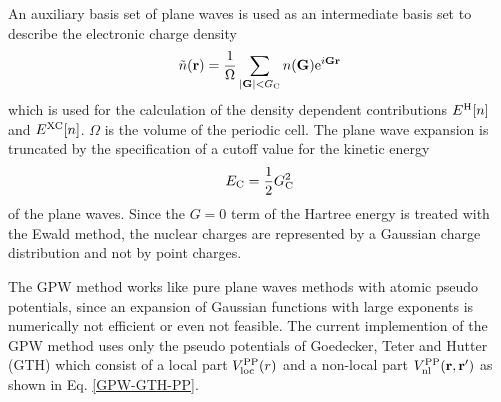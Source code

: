 \documentclass[12pt,twoside]{article}
\begin{document}
An auxiliary basis set of plane waves is used as an intermediate basis set
to describe the electronic charge density
\[
 \tilde n({\bf r}) = \frac{1}{\Omega}\sum_{|{\bf G}| < G_{\rm C}}
                     n({\bf G}) {\rm e}^{i {\bf Gr}}
\]
which is used for the calculation of the density dependent contributions
$E^{\rm H}[n]$ and $E^{\rm XC}[n]$.
$\Omega$ is the volume of the periodic cell. The plane wave expansion is
truncated by the specification of a cutoff value for the kinetic energy
\[
 E_{\rm C} = \frac{1}{2} G_{\rm C}^2
\]
of the plane waves.
Since the $G = 0$ term of the Hartree energy is treated with the Ewald method,
the nuclear charges are represented by a Gaussian charge distribution and not
by point charges.

The GPW method works like pure plane waves methods with atomic pseudo
potentials, since an expansion of Gaussian functions with large exponents
is numerically not efficient or even not feasible.
The current implemention of the GPW method uses only the pseudo potentials
of Goedecker, Teter and Hutter (GTH) \cite{GTH:1996,GTH:1998} which
consist of a local part $V_{\rm loc}^{\rm PP}(r)$ and a non-local part
$V_{\rm nl}^{\rm PP}({\bf r},{\bf r}^\prime)$ as shown in
Eq. \ref{GPW-GTH-PP}.
\newpage
%


%
\printindex
%
\end{document}
